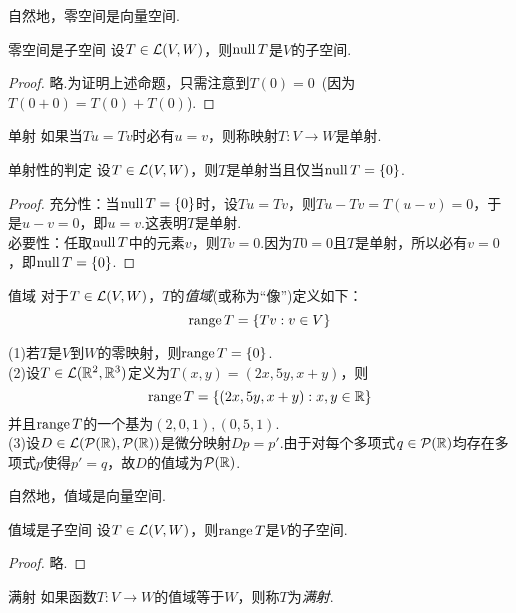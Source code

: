 自然地，零空间是向量空间.

\begin{proposition}{零空间是子空间}
	设$T \in \mathcal{L} (V,W)$，则$\operatorname{null} T$是$V$的子空间.
\end{proposition}
\begin{proof}
	略.为证明上述命题，只需注意到$T(0)=0$~(因为$T(0+0)=T(0)+T(0)$).
\end{proof}

\begin{definition}{单射}
	如果当$Tu=Tv$时必有$u=v$，则称映射$T:V \to W$是单射.
\end{definition}

\begin{proposition}{单射性的判定}
	设$T \in \mathcal{L} (V,W)$，则$T$是单射当且仅当$\operatorname{null} T=\{ 0 \}$.
\end{proposition}
\begin{proof}
	 充分性：当$\operatorname{null} T = \{ 0 \}$时，设$Tu=Tv$，则$Tu-Tv=T(u-v)=0$，于是$u-v=0$，即$u=v$.这表明$T$是单射. \\
	 必要性：任取$\operatorname{null} T$中的元素$v$，则$Tv=0$.因为$T0=0$且$T$是单射，所以必有$v=0$，即$\operatorname{null} T = \{ 0 \}$.
\end{proof}

\begin{definition}{值域}
	对于$T \in \mathcal{L} (V,W)$，$T$的\textit{值域}(或称为“像”)定义如下：$$\operatorname{range} T = \{ Tv : v \in V \}$$
\end{definition}

\begin{example}{}
	(1)若$T$是$V$到$W$的零映射，则$\operatorname{range} T=\{ 0 \}$. \\
	(2)设$T \in \mathcal{L} (\mathbb{R} ^2,\mathbb{R} ^3)$定义为$T(x,y)=(2x,5y,x+y)$，则$$\operatorname{range} T = \{ (2x,5y,x+y):x,y \in \mathbb{R} \}$$
	并且$\operatorname{range} T$的一个基为$(2,0,1),(0,5,1)$. \\
	(3)设$D \in \mathcal{L} (\mathcal{P}(\mathbb{R} ),\mathcal{P}(\mathbb{R} ))$是微分映射$Dp=p'$.由于对每个多项式$q \in \mathcal{P}(\mathbb{R} )$均存在多项式$p$使得$p'=q$，故$D$的值域为$\mathcal{P}(\mathbb{R} )$.
\end{example}

自然地，值域是向量空间.

\begin{proposition}{值域是子空间}
	设$T \in \mathcal{L} (V,W)$，则$\operatorname{range} T$是$V$的子空间.
\end{proposition}
\begin{proof}
	略.
\end{proof}

\begin{definition}{满射}
	如果函数$T:V \to W$的值域等于$W$，则称$T$为\textit{满射}.
\end{definition}

